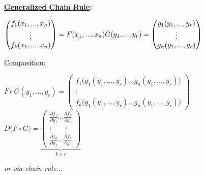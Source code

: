 \documentclass[a4paper,12pt]{report}
\begin{document}
	\textbf{\underline{Generalized Chain Rule}:}
	\begin{center}
		$
		\begin{pmatrix}
			f_1(x_1,...,x_n)\\
			\vdots \\
			f_k(x_1,...,x_n)
		\end{pmatrix}
		=F(x_1,...,x_n)
		\linebreak
		\bigskip
		G(y_1,...,y_r) =
		\begin{pmatrix}
			g_1(y_1,...,y_r) \\
			\vdots \\
			g_n(y_1,...,y_r)
		\end{pmatrix}
		$

\end{center}		
		\hspace{5mm} \underline{Composition:}\\
\begin{center}
		$
		F \circ G(y_1,...,y_r) =
		\begin{pmatrix}
			f_1 \big( g_1(y_1,...,y_r) ... g_n(y_1,...,y_r) \big) \\
			\vdots \\
			f_k \big( g_1(y_1,...,y_r) ... g_n(y_1,...,y_r) \big)
		\end{pmatrix}
		$
		\linebreak
		\linebreak
		\vspace{1cm}
		$ D \big( F \circ G \big) =
		\underbrace{
		\begin{pmatrix}
				\frac{\partial f_1}{\partial y_1}...\frac{\partial f_1}{\partial y_r} \\
				\vdots \qquad \vdots \\
				\frac{\partial f_k}{\partial y_1}...\frac{\partial f_k}{\partial y_r}	
		\end{pmatrix}}_{k \times r}
		$
	\end{center}
	\hspace{5mm} \textit{or via chain rule...}
\end{document}
